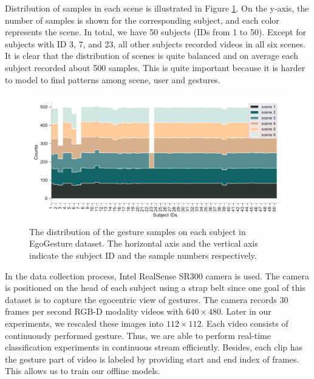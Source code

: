 Distribution of samples in each scene is illustrated in Figure \ref{fig:egogesturedist}. On the y-axis, the number of samples is shown for the corresponding subject, and each color represents the scene.  In total, we have 50 subjects (IDs from 1 to 50). Except for subjects with ID 3, 7, and 23, all other subjects recorded videos in all six scenes. It is clear that the distribution of scenes is quite balanced and on average each subject recorded about  500 samples.  This is quite important because it is harder to model to find patterns among scene, user and gestures.\\
\begin{figure}[h]
	\centering
	\includegraphics[width=1\linewidth]{figures/egogesturedist}
	\caption{The distribution of the gesture samples on each subject in EgoGesture dataset. The horizontal axis and the vertical axis indicate the subject ID and the sample numbers respectively.}
	\label{fig:egogesturedist}
\end{figure}

In the data collection process, Intel RealSense SR300 camera is used.  The camera is positioned on the head of each subject using a strap belt since one goal of this dataset is to capture the egocentric view of gestures.  The camera records 30 frames per second RGB-D modality videos with $640\times480$. Later in our experiments, we rescaled these images into $112\times112$. Each video consists of continuously performed gesture.  Thus, we are able to perform real-time classification experiments in continuous stream efficiently.  Besides, each clip has the gesture part of video  is labeled by providing start and end index of frames.  This allows us to train our offline models. \\


